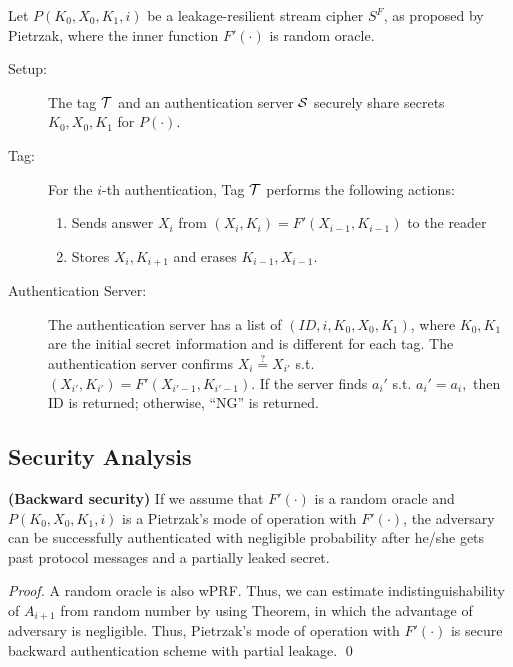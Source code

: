 \documentclass[english]{llncs}
\begin{document}
Let $P(K_{0},X_{0},K_{1},i)$ be a leakage-resilient stream cipher
$S^{F}$, as proposed by Pietrzak, where the inner function $F'(\cdot)$ is random oracle.
\begin{description}
\item [{Setup:}] The tag ${\cal {T}}$ and an authentication server ${\cal {S}}$
securely share secrets $K_{0},X_{0},K_{1}$ for $P(\cdot)$.
\item [{Tag:}] For the $i$-th authentication, Tag ${\cal T}$ performs
the following actions:

\begin{enumerate}
\item Sends answer $X_i$ from $(X_i, K_i ) =F'(X_{i-1},K_{i-1})$ to the
reader 
\item Stores $X_{i},K_{i+1}$ and erases $K_{i-1},X_{i-1}$. 
\end{enumerate}
\item [{Authentication Server:}] The authentication server has a list of
$(ID,i,K_{0},X_{0},K_{1})$, where $K_0, K_1$ are the initial secret
information and is different for each tag. The authentication server
confirms $X_{i}\stackrel{?}{=} X_{i'}$
 s.t. $(X_{i'}, K_{i'}) = F'(X_{i'-1},K_{i'-1})$.
 If the server finds $a_{i}'$ s.t. $a_{i}'=a_{i},$ then ID is returned;
otherwise, {}``NG'' is returned.
\end{description}

\subsection{Security Analysis}


\begin{theorem}
\textbf{(Backward security)} If we assume that $F'(\cdot)$ is a random
oracle and $P(K_{0},X_{0},K_{1},i)$ is a Pietrzak's mode of operation with $F'(\cdot)$, 
the adversary can be successfully authenticated with negligible
probability after he/she gets past protocol messages and a partially
leaked secret. \end{theorem}
\begin{proof}
A random oracle is also wPRF. Thus, we can estimate indistinguishability of $A_{i+1}$ from random 
number by using Theorem, in which the advantage of adversary is negligible.
Thus, Pietrzak's mode of operation with $F'(\cdot)$ is secure backward authentication scheme with
partial leakage.
\qed \end{proof}
\end{document}
